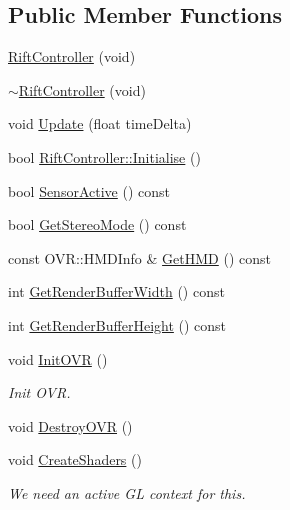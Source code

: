 \subsection*{Public Member Functions}
\begin{DoxyCompactItemize}
\item 
\hyperlink{class_b_g_e_1_1_rift_controller_a16f6dc4bdbd1d87b93d589e0487089c0}{Rift\-Controller} (void)
\item 
\hyperlink{class_b_g_e_1_1_rift_controller_a5dac2e77c810eb03d353cd41b6fdee72}{$\sim$\-Rift\-Controller} (void)
\item 
void \hyperlink{class_b_g_e_1_1_rift_controller_a1766842828c502080d013a2781219c24}{Update} (float time\-Delta)
\item 
bool \hyperlink{class_b_g_e_1_1_rift_controller_aeb745dc67dbbe1a3e353957349012605}{Rift\-Controller\-::\-Initialise} ()
\item 
bool \hyperlink{class_b_g_e_1_1_rift_controller_a23c8dacb415dbfc9fbe632f3d23918a5}{Sensor\-Active} () const 
\item 
bool \hyperlink{class_b_g_e_1_1_rift_controller_a50b725bc8a9d4f4de00953898c8e2b11}{Get\-Stereo\-Mode} () const 
\item 
const O\-V\-R\-::\-H\-M\-D\-Info \& \hyperlink{class_b_g_e_1_1_rift_controller_a43ba240a039b1cd106ebc5597c20b23a}{Get\-H\-M\-D} () const 
\item 
int \hyperlink{class_b_g_e_1_1_rift_controller_a173a2464a083a912b238f947924be319}{Get\-Render\-Buffer\-Width} () const 
\item 
int \hyperlink{class_b_g_e_1_1_rift_controller_acef8ad5f634a6b4fc64fd9e318f0a4a2}{Get\-Render\-Buffer\-Height} () const 
\item 
void \hyperlink{class_b_g_e_1_1_rift_controller_a648923024ea31a041f029ed4d33686ae}{Init\-O\-V\-R} ()
\begin{DoxyCompactList}\small\item\em Init O\-V\-R. \end{DoxyCompactList}\item 
void \hyperlink{class_b_g_e_1_1_rift_controller_ac911710e9e18a1ae6462b02e19b44ea2}{Destroy\-O\-V\-R} ()
\item 
void \hyperlink{class_b_g_e_1_1_rift_controller_a86ebbf96ab072163d661f52c57fadaf8}{Create\-Shaders} ()
\begin{DoxyCompactList}\small\item\em We need an active G\-L context for this. \end{DoxyCompactList}\item 

\end{DoxyCompactItemize}
